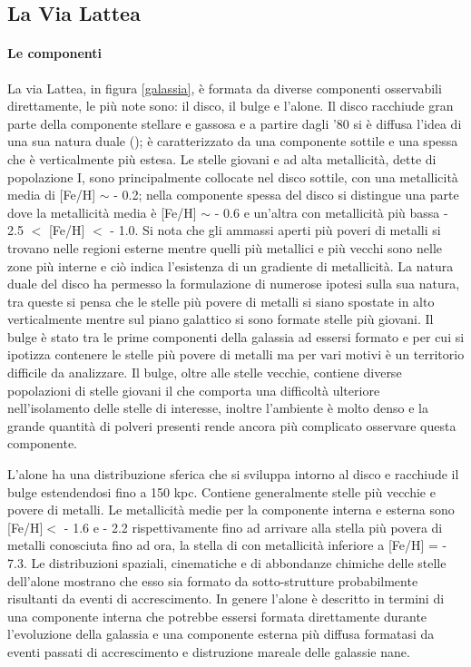 \documentclass[12pt]{article}
\begin{document}
\subsection{La Via Lattea}

\paragraph{Le componenti}
\label{componenti}
La via Lattea, in figura \ref{galassia}, è formata da diverse componenti osservabili direttamente, le più note sono: il disco, il bulge e l’alone.
Il disco racchiude gran parte della componente stellare e gassosa e a partire dagli ’80 si è diffusa l’idea di una sua natura duale (\cite{Yoshii}); è caratterizzato da una componente sottile e una spessa che è verticalmente più estesa. Le stelle giovani e ad alta metallicità, dette di popolazione I, sono principalmente collocate nel disco sottile, con una metallicità media di [Fe/H] $\sim$ - 0.2; nella componente spessa del disco si distingue una parte dove la metallicità media è [Fe/H] $\sim$  - 0.6 e un’altra con metallicità più bassa - 2.5 $<$ [Fe/H] $<$ - 1.0. Si nota che gli ammassi aperti più poveri di metalli si trovano nelle regioni esterne mentre quelli più metallici e più vecchi sono nelle zone più interne e ciò indica l’esistenza di un gradiente di metallicità. La natura duale del disco ha permesso la formulazione di numerose ipotesi sulla sua natura, tra queste si pensa che le stelle più povere di metalli si siano spostate in alto verticalmente mentre sul piano galattico si sono formate stelle più giovani.
Il bulge è stato tra le prime componenti della galassia ad essersi formato e per cui si ipotizza contenere le stelle più povere di metalli ma per vari motivi è un territorio difficile da analizzare. Il bulge, oltre alle stelle vecchie, contiene diverse popolazioni di stelle giovani il che comporta una difficoltà ulteriore nell’isolamento delle stelle di interesse, inoltre l’ambiente è molto denso e la grande quantità di polveri presenti rende ancora più complicato osservare questa componente. 

L’alone ha una distribuzione sferica che si sviluppa intorno al disco e racchiude il bulge estendendosi fino a 150 kpc. Contiene generalmente stelle più vecchie e povere di metalli. Le metallicità medie per la componente interna e esterna sono [Fe/H]$<$ - 1.6 e - 2.2 rispettivamente fino ad arrivare alla stella più povera di metalli conosciuta fino ad ora, la stella di \cite{keller} con metallicità inferiore a [Fe/H] = - 7.3.
Le distribuzioni spaziali, cinematiche e di abbondanze chimiche delle stelle dell’alone mostrano che esso sia formato da sotto-strutture probabilmente risultanti da eventi di accrescimento.  In genere l’alone è descritto in termini di una componente interna che potrebbe essersi formata direttamente durante l’evoluzione della galassia e una componente esterna più diffusa formatasi da eventi passati di accrescimento e distruzione mareale delle galassie nane. 
\end{document}
